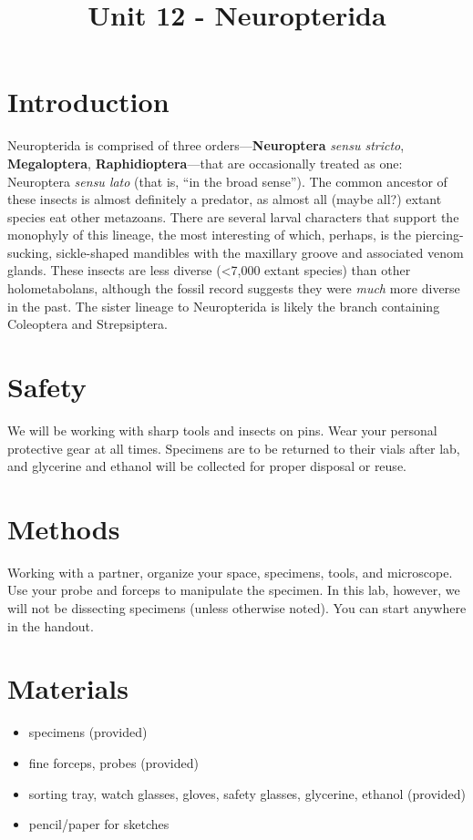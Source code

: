 \documentclass[letterpaper, 11pt]{article}
\title{Unit 12 - Neuropterida}
\author{}
\begin{document}
\cleanlookdateon %
\maketitle
\thispagestyle{fancy}
\section*{Introduction}
Neuropterida is comprised of three orders---\textbf{Neuroptera} \textit{sensu stricto}, \textbf{Megaloptera}, \textbf{Raphidioptera}---that are occasionally treated as one: Neuroptera \textit{sensu lato} (that is, ``in the broad sense''). The common ancestor of these insects is almost definitely a predator, as almost all (maybe all?) extant species eat other metazoans. There are several larval characters that support the monophyly of this lineage, the most interesting of which, perhaps, is the piercing-sucking, sickle-shaped mandibles with the maxillary groove and associated venom glands. These insects are less diverse (\textless7,000 extant species) than other holometabolans, although the fossil record suggests they were \textit{much} more diverse in the past. The sister lineage to Neuropterida is likely the branch containing Coleoptera and Strepsiptera.

\section*{Safety}
We will be working with sharp tools and insects on pins. Wear your personal protective gear at all times. Specimens are to be returned to their vials after lab, and glycerine and ethanol will be collected for proper disposal or reuse.

\section*{Methods}
Working with a partner, organize your space, specimens, tools, and microscope. Use your probe and forceps to manipulate the specimen. In this lab, however, we will not be dissecting specimens (unless otherwise noted). You can start anywhere in the handout.

\section*{Materials}
\begin{itemize}
\item specimens (provided)
\item fine forceps, probes (provided)
\item sorting tray, watch glasses, gloves, safety glasses, glycerine, ethanol (provided)
\item pencil/paper for sketches
\end{itemize}
\end{document}
